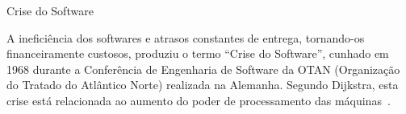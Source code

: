 
\begin{frame}{Crise do Software}

  A ineficiência dos softwares e atrasos constantes de entrega,
  tornando-os financeiramente custosos, produziu o termo ``Crise do
  Software'', cunhado em 1968 durante a Conferência de Engenharia de
  Software da OTAN (Organização do Tratado do Atlântico Norte)
  realizada na Alemanha. Segundo Dijkstra, esta crise está relacionada
  ao aumento do poder de processamento das
  máquinas~\cite{humble:dijkstra1972}.

\end{frame}


